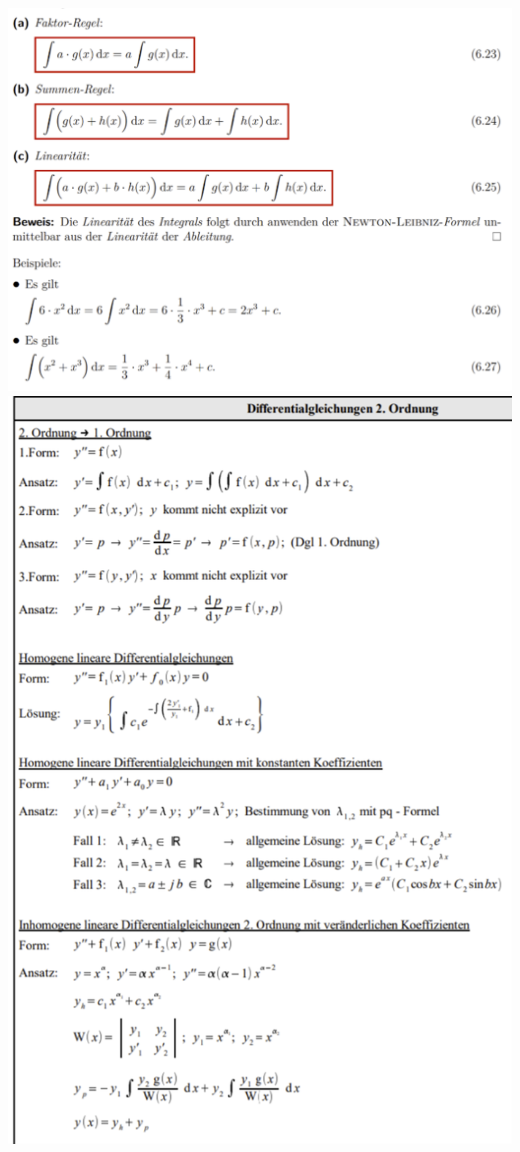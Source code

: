 \includegraphics[width=\columnwidth]{./images/int3.png}
\includegraphics[width=\columnwidth]{./images/int4.png}
\vspace{1mm}

